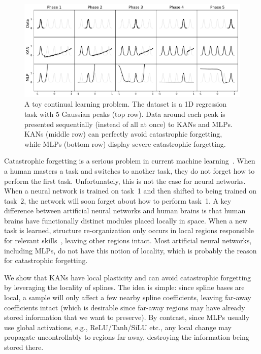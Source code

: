 \documentclass{article}
\numberwithin{equation}{section}
\numberwithin{figure}{section}
\begin{document}
\begin{figure}[tbp]
    \centering
    \includegraphics[width=1\linewidth]{figs/continual_learning.pdf}
    \caption{A toy continual learning problem. The dataset is a 1D regression task with 5 Gaussian peaks (top row). Data around each peak is presented sequentially (instead of all at once) to KANs and MLPs. KANs (middle row) can perfectly avoid catastrophic forgetting, while MLPs (bottom row) display severe catastrophic forgetting. }
    \label{fig:continual-learning}
\end{figure}

Catastrophic forgetting is a serious problem in current machine learning~\cite{kemker2018measuring}. When a human masters a task and switches to another task, they do not forget how to perform the first task. Unfortunately, this is not the case for neural networks. When a neural network is trained on task~1 and then shifted to being trained on task~2, the network will soon forget about how to perform task~1. A key difference between artificial neural networks and human brains is that human brains have functionally distinct modules placed locally in space. When a new task is learned, structure re-organization only occurs in local regions responsible for relevant skills~\cite{kolb1998brain,meunier2010modular}, leaving other regions intact. Most artificial neural networks, including MLPs, do not have this notion of locality, which is probably the reason for catastrophic forgetting. 

We show that KANs have local plasticity and can avoid catastrophic forgetting by leveraging the locality of splines. The idea is simple: since spline bases are local, a sample will only affect a few nearby spline coefficients, leaving far-away coefficients intact (which is desirable since far-away regions may have already stored information that we want to preserve). By contrast, since MLPs usually use global activations, e.g., ReLU/Tanh/SiLU etc., any local change may propagate uncontrollably to regions far away, destroying the information being stored there.
\end{document}
